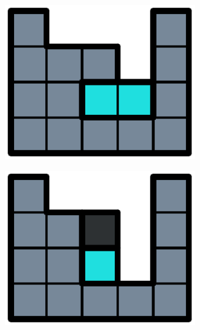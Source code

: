 \begin{figure}[ht]
  \centering
  \begin{subfigure}[b]{0.2\textwidth}
    \centering
    \includegraphics[width=0.9\textwidth]{pictures/dominoes/drs-1.pdf}
    \caption{}
  \end{subfigure}
  \begin{subfigure}[b]{0.2\textwidth}
    \centering
    \includegraphics[width=0.9\textwidth]{pictures/dominoes/drs-2.pdf}
    \caption{}
  \end{subfigure}
  \begin{subfigure}[b]{0.2\textwidth}
    \centering

\end{subfigure}
\end{figure}
